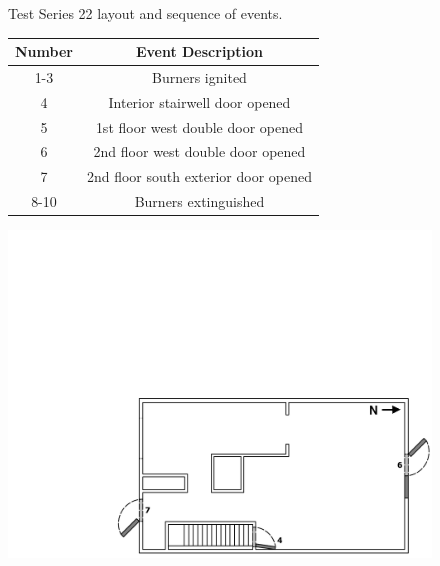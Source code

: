 \documentclass[12pt,oneside]{book}
\begin{document}
\begin{figure}[!ht]
\begin{minipage}[b]{0.9\columnwidth}
\end{minipage}
\caption{Test Series 22 layout and sequence of events.}
\label{fig:west_test_22}
\end{figure}

\begin{figure}[!ht]
\begin{minipage}[b]{0.8\columnwidth}
	\begin{flushleft}
	\small
	\begin{tabular}[b]{cc}
 	\toprule
 	\textbf{Number} & \textbf{Event Description} \\
 	\midrule
 	1-3  & Burners ignited \\
 	4	 & Interior stairwell door opened \\
 	5 	 & 1st floor west double door opened \\
 	6	 & 2nd floor west double door opened \\
 	7 	 & 2nd floor south exterior door opened \\
 	8-10 & Burners extinguished \\
	\bottomrule
	\end{tabular}
	\end{flushleft}
\end{minipage}
\begin{minipage}[b]{0.9\columnwidth}
	\vspace{15pt}
	\centering
	\includegraphics[width=\columnwidth]{../Figures/Floor_Plans/West_Structure_2nd_Floor_Test_24}

\end{minipage}
\end{figure}
\end{document}
